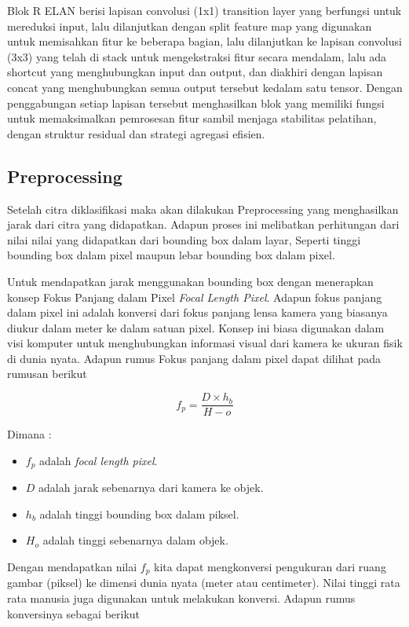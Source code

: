 Blok R ELAN berisi lapisan convolusi (1x1) transition layer yang berfungsi untuk mereduksi input, lalu dilanjutkan dengan split feature map yang digunakan untuk memisahkan fitur ke beberapa bagian, lalu dilanjutkan ke lapisan convolusi (3x3) yang telah di stack untuk mengekstraksi fitur secara mendalam, lalu ada shortcut yang menghubungkan input dan output, dan diakhiri dengan lapisan concat yang menghubungkan semua output tersebut kedalam satu tensor. Dengan penggabungan setiap lapisan tersebut menghasilkan blok yang memiliki fungsi untuk memaksimalkan pemrosesan fitur sambil menjaga stabilitas pelatihan, dengan struktur residual dan strategi agregasi efisien.

\subsection{Preprocessing}
Setelah citra diklasifikasi maka akan dilakukan Preprocessing yang menghasilkan jarak dari citra yang didapatkan. Adapun proses ini melibatkan perhitungan dari nilai nilai yang didapatkan dari bounding box dalam layar, Seperti tinggi bounding box dalam pixel maupun lebar bounding box dalam pixel.

Untuk mendapatkan jarak menggunakan bounding box dengan menerapkan konsep Fokus Panjang dalam Pixel \emph{Focal Length Pixel}. Adapun fokus panjang dalam pixel ini adalah konversi dari fokus panjang lensa kamera  yang biasanya diukur dalam meter ke dalam satuan pixel. Konsep ini biasa digunakan dalam visi komputer untuk menghubungkan informasi visual dari kamera ke ukuran fisik di dunia nyata. Adapun rumus Fokus panjang dalam pixel dapat dilihat pada rumusan berikut

\begin{equation}
    f_p = \frac{D \times h_b}{H-o}
\end{equation}

Dimana :
\begin{itemize}
    \item $f_p$ adalah \emph{focal length pixel}.
    \item $D$ adalah jarak sebenarnya dari kamera ke objek.
    \item $h_b$ adalah tinggi bounding box dalam piksel.
    \item $H_o$ adalah tinggi sebenarnya dalam objek.
\end{itemize}

Dengan mendapatkan nilai $f_p$ kita dapat mengkonversi pengukuran dari ruang gambar (piksel) ke dimensi dunia nyata (meter atau centimeter). Nilai tinggi rata rata manusia juga digunakan untuk melakukan konversi. Adapun rumus konversinya sebagai berikut

